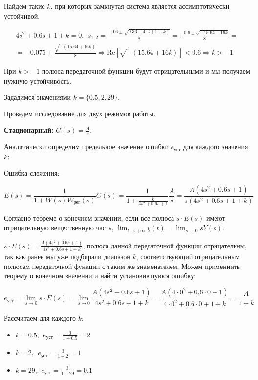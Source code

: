 Найдем такие $k$, при которых замкнутая система является ассимптотически устойчивой.

\begin{par}
$$\begin{array}{l}
4s^2 +0.6s+1+k=0,~~s_{1,2} =\frac{-0.6\pm \sqrt{0.36-4\cdot 4(1+k)}}{8}=\frac{-0.6\pm \sqrt{-15.64-16k}}{8}=\\
=-0.075\pm \frac{\sqrt{-(15.64+16k)}}{8}\Rightarrow \textrm{Re}\left\lbrack \sqrt{-(15.64+16k)}\right\rbrack <0.6\Rightarrow k>-1
\end{array}$$
\end{par}


При $k>-1$ полюса передаточной функции будут отрицательными и мы получаем нужную устойчивость.


Зададимся значениями $k=\lbrace 0.5,2,29\rbrace$.


Проведем исследование для двух режимов работы.


\textbf{Стационарный: }$G(s)=\frac{A}{s}$.


Аналитически определим предельное значение ошибки $e_{уст}$ для каждого значения $k$:


Ошибка слежения:

\begin{par}
$$E(s)=\frac{1}{1+W(s)W_{\textrm{рег}} (s)}G(s)=\frac{1}{1+\frac{k}{4s^2 +0.6s+1}}\frac{A}{s}=\frac{A(4s^2 +0.6s+1)}{s(4s^2 +0.6s+1+k)}$$
\end{par}


Согласно теореме о конечном значении, если все полюса $s\cdot E(s)$ имеют отрицательную вещественную часть, $\lim_{t\to +\infty } y(t)=\lim_{s\to 0} sY(s)$.


$s\cdot E(s)=\frac{A(4s^2 +0.6s+1)}{4s^2 +0.6s+1+k}$, полюса данной передаточной функции отрицательны, так как ранее мы уже подбирали диапазон $k$, соответствующий отрицательным полюсам передаточной функции с таким же знаменателем. Можем применнить теорему о конечном значении и найти установившуюся ошибку:

\begin{par}
$$e_{\text{уст}} =\lim_{s\to 0} s\cdot E(s)=\lim_{s\to 0} \frac{A(4s^2 +0.6s+1)}{4s^2 +0.6s+1+k}=\frac{A(4\cdot 0^2 +0.6\cdot 0+1)}{4\cdot 0^2 +0.6\cdot 0+1+k}=\frac{A}{1+k}$$
\end{par}


Рассчитаем для каждого $k$:

\begin{itemize}
\setlength{\itemsep}{-1ex}
   \item{\begin{flushleft} $\displaystyle k=0.5,~~e_{\text{уст}} =\frac{3}{1+0.5}=2$ \end{flushleft}}
   \item{\begin{flushleft} $\displaystyle k=2,~~e_{\text{уст}} =\frac{3}{1+2}=1$ \end{flushleft}}
   \item{\begin{flushleft} $\displaystyle k=29,~~e_{\text{уст}} =\frac{3}{1+29}=0.1$ \end{flushleft}}
\end{itemize}


